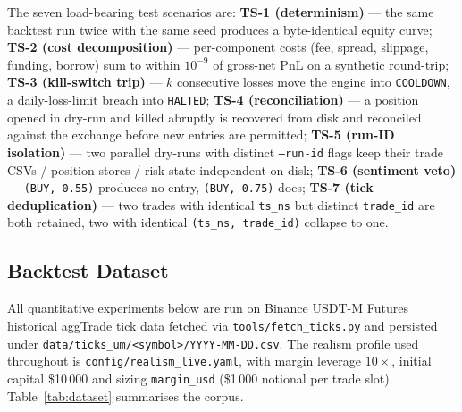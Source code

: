 \documentclass[a4paper, 12pt, titlepage]{article}
\begin{document}
The seven load-bearing test scenarios are:
\textbf{TS-1 (determinism)} --- the same backtest run twice with
the same seed produces a byte-identical equity curve;
\textbf{TS-2 (cost decomposition)} --- per-component costs (fee,
spread, slippage, funding, borrow) sum to within $10^{-9}$ of
gross-net PnL on a synthetic round-trip;
\textbf{TS-3 (kill-switch trip)} --- $k$ consecutive losses move
the engine into \texttt{COOLDOWN}, a daily-loss-limit breach into
\texttt{HALTED};
\textbf{TS-4 (reconciliation)} --- a position opened in dry-run
and killed abruptly is recovered from disk and reconciled against
the exchange before new entries are permitted;
\textbf{TS-5 (run-ID isolation)} --- two parallel dry-runs with
distinct \texttt{--run-id} flags keep their trade CSVs / position
stores / risk-state independent on disk;
\textbf{TS-6 (sentiment veto)} --- \texttt{(BUY, 0.55)} produces
no entry, \texttt{(BUY, 0.75)} does;
\textbf{TS-7 (tick deduplication)} --- two trades with identical
\texttt{ts\_ns} but distinct \texttt{trade\_id} are both retained,
two with identical \texttt{(ts\_ns, trade\_id)} collapse to one.

\subsection{Backtest Dataset}

All quantitative experiments below are run on Binance USDT-M Futures
historical aggTrade tick data fetched via
\texttt{tools/fetch\_ticks.py} and persisted under
\texttt{data/ticks\_um/<symbol>/YYYY-MM-DD.csv}. The realism profile
used throughout is \texttt{config/realism\_live.yaml}, with margin
leverage $10\times$, initial capital \$10\,000 and sizing
\texttt{margin\_usd} (\$1\,000 notional per trade slot).
Table~\ref{tab:dataset} summarises the corpus.
\end{document}
